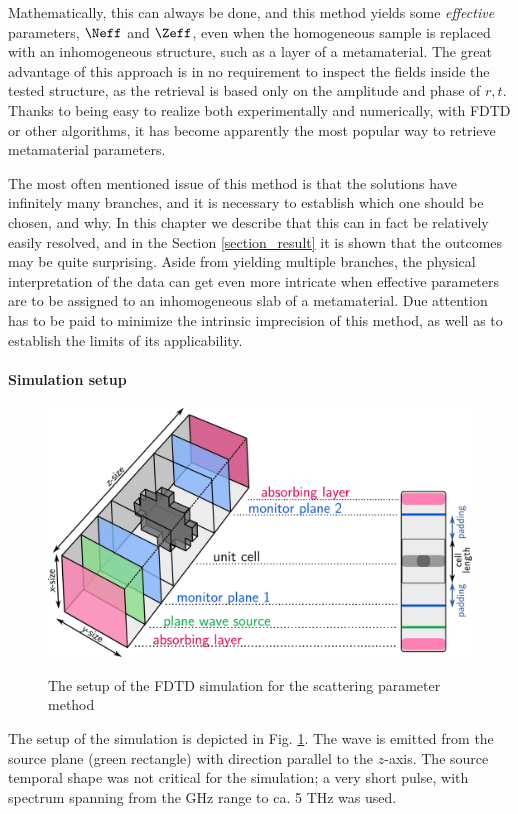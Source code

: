 Mathematically, this can always be done, and this method yields some \textit{effective} parameters, $\Neff$ and $\Zeff$, even when the homogeneous sample is replaced with an inhomogeneous structure, such as a layer of a metamaterial. The great advantage of this approach is in no requirement to inspect the fields inside the tested structure, as the retrieval is based only on the amplitude and phase of $r,t$. Thanks to being easy to realize both experimentally and numerically, with FDTD or other algorithms, %
it has become apparently the most popular way to retrieve metamaterial parameters. 

The most often mentioned issue of this method is that the solutions have infinitely many branches, and it is necessary to establish which one should be chosen, and why. In this chapter we describe that this can in fact be relatively easily resolved, and in the Section \ref{section_result} it is shown that the outcomes may be quite surprising.
Aside from yielding multiple branches, the physical interpretation of the data can get even more intricate when effective parameters are to be assigned to an inhomogeneous slab of a metamaterial. Due attention has to be paid to minimize the intrinsic imprecision of this method, as well as to establish the limits of its applicability. 
\paragraph{Simulation setup} %
\begin{figure}[h] \centering \caption{The setup of the FDTD simulation for the scattering parameter method} \includegraphics[width=12cm]{img/meep_geometry.pdf}  \label{fg_fdtd_sparam} \end{figure} 
The setup of the simulation is depicted in Fig. \ref{fg_fdtd_sparam}. The wave is emitted from the source plane (green rectangle) with direction parallel to the $z$-axis. The source temporal shape was not critical for the simulation; a very short pulse, with spectrum spanning from the GHz range to ca. 5 THz was used. 

